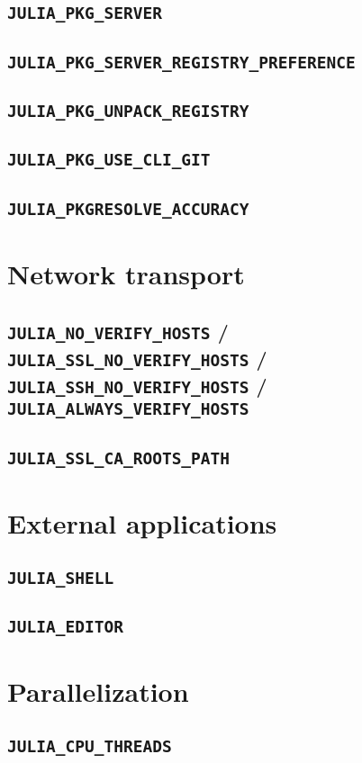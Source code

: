    \subsection{\texttt{JULIA\_PKG\_SERVER}}
    \subsection{\texttt{JULIA\_PKG\_SERVER\_REGISTRY\_PREFERENCE}}
    \subsection{\texttt{JULIA\_PKG\_UNPACK\_REGISTRY}}
    \subsection{\texttt{JULIA\_PKG\_USE\_CLI\_GIT}}
    \subsection{\texttt{JULIA\_PKGRESOLVE\_ACCURACY}}
    \section{Network transport}
    \subsection{\texttt{JULIA\_NO\_VERIFY\_HOSTS} / \texttt{JULIA\_SSL\_NO\_VERIFY\_HOSTS} / \texttt{JULIA\_SSH\_NO\_VERIFY\_HOSTS} / \texttt{JULIA\_ALWAYS\_VERIFY\_HOSTS}}
    \subsection{\texttt{JULIA\_SSL\_CA\_ROOTS\_PATH}}
    \section{External applications}
    \subsection{\texttt{JULIA\_SHELL}}
    \subsection{\texttt{JULIA\_EDITOR}}
    \section{Parallelization}
    \subsection{\texttt{JULIA\_CPU\_THREADS}}

